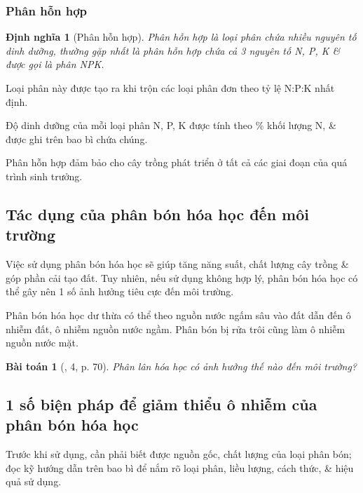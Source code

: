 \documentclass{article}
\newtheorem{baitoan}{Bài toán}
\newtheorem{dinhnghia}{Định nghĩa}
\begin{document}
\subsubsection{Phân hỗn hợp}

\begin{dinhnghia}[Phân hỗn hợp]
	\emph{Phân hỗn hợp} là loại phân chứa nhiều nguyên tố dinh dưỡng, thường gặp nhất là phân hỗn hợp chứa cả 3 nguyên tố \emph{N, P, K} \& được gọi là \emph{phân NPK}.
\end{dinhnghia}
Loại phân này được tạo ra khi trộn các loại phân đơn theo tỷ lệ N:P:K nhất định.

Độ dinh dưỡng của mỗi loại phân N, P, K được tính theo \% khối lượng N,  \& được ghi trên bao bì chứa chúng.

Phân hỗn hợp đảm bảo cho cây trồng phát triển ở tất cả các giai đoạn của quá trình sinh trưởng.

\subsection{Tác dụng của phân bón hóa học đến môi trường}
Việc sử dụng phân bón hóa học sẽ giúp tăng năng suất, chất lượng cây trồng \& góp phần cải tạo đất. Tuy nhiên, nếu sử dụng không hợp lý, phân bón hóa học có thể gây nên 1 số ảnh hưởng tiêu cực đến môi trường.

Phân bón hóa học dư thừa có thể theo nguồn nước ngấm sâu vào đất dẫn đến ô nhiễm đất, ô nhiễm nguồn nước ngầm. Phân bón bị rửa trôi cũng làm ô nhiễm nguồn nước mặt.

\begin{baitoan}[\cite{SGK_KHTN_8_Canh_Dieu}, 4, p. 70]
	Phân lân hóa học có ảnh hưởng thế nào đến môi trường?
\end{baitoan}

\subsection{1 số biện pháp để giảm thiểu ô nhiễm của phân bón hóa học}
Trước khi sử dụng, cần phải biết được nguồn gốc, chất lượng của loại phân bón; đọc kỹ hướng dẫn trên bao bì để nắm rõ loại phân, liều lượng, cách thức, \& hiệu quả sử dụng.
\end{document}
